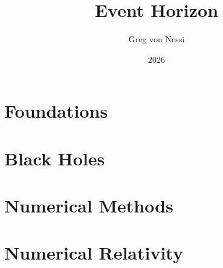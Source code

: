 \documentclass{ehbook}
\title{Event Horizon}
\author{Greg von Nessi}
\date{2026}
\begin{document}
\frontmatter



\tableofcontents
\listoffigures
\listoftables

\mainmatter

\part{Foundations}




\part{Black Holes}




\part{Numerical Methods}





\part{Numerical Relativity}







\end{document}
